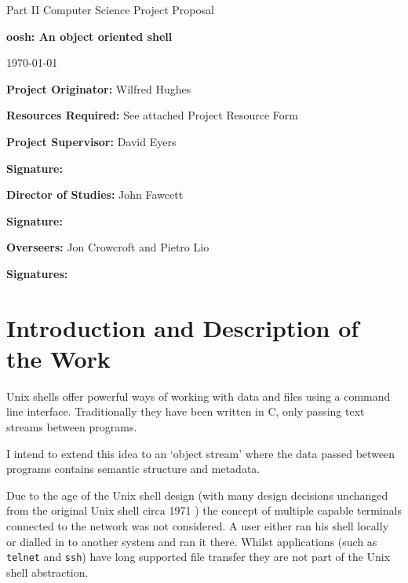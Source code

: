\documentclass[12pt]{article}
\begin{document}
\thispagestyle{empty}

\medskip
{}
\medskip
{}

\vfil

\centerline{\large Part II Computer Science Project Proposal}
\vspace{0.4in}
\centerline{\Large\bf oosh: An object oriented shell}
\vspace{0.3in}
\centerline{\large \today}

\vfil

{\bf Project Originator:} Wilfred Hughes

\vspace{0.1in}

{\bf Resources Required:} See attached Project Resource Form

\vspace{0.5in}

{\bf Project Supervisor:} David Eyers

\vspace{0.2in}

{\bf Signature:}

\vspace{0.5in}

{\bf Director of Studies:}  John Fawcett

\vspace{0.2in}

{\bf Signature:}

\vspace{0.5in}

{\bf Overseers:} Jon Crowcroft and Pietro Lio

\vspace{0.2in}

{\bf Signatures:}

\vfil
\eject

\section*{Introduction and Description of the Work}
Unix shells offer powerful ways of working with data and files using a
command line interface. Traditionally they have been written in C,
only passing text streams between programs.

I intend to extend this idea to an `object stream' where the data
passed between programs contains semantic structure and metadata. 

Due to the age of the Unix shell design (with many design decisions
unchanged from the original Unix shell circa 1971 \cite{firstshell})
the concept of multiple capable terminals connected to the network was
not considered. A user either ran his shell locally or dialled in to
another system and ran it there. Whilst applications (such as
\texttt{telnet} and \texttt{ssh}) have long supported file transfer
they are not part of the Unix shell abstraction.
\end{document}
